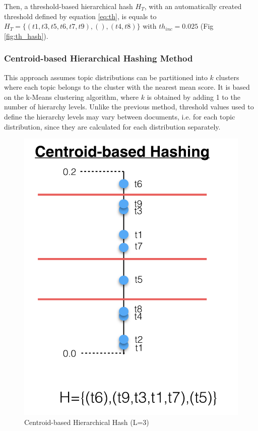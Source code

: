 Then, a threshold-based hierarchical hash $H_{T}$, with an automatically created threshold defined by equation \ref{eq:th}, is equals to $H_{T}=\{(t1,t3,t5,t6,t7,t9),(),(t4,t8)\}$ with $th_{inc}=0.025$ (Fig  \ref{fig:th_hash}).

\subsubsection{Centroid-based Hierarchical Hashing Method}
\label{sec:comparison-centroid}
This approach assumes topic distributions can be partitioned into $k$ clusters where each topic belongs to the cluster with the nearest mean score. It is based on the k-Means clustering algorithm, where $k$ is obtained by adding 1 to the number of hierarchy levels. Unlike the previous method, threshold values used to define the hierarchy levels may vary between documents, i.e. for each topic distribution, since they are calculated for each distribution separately.

\begin{figure}[t]\centering
\includegraphics[scale=0.35]{centroid-hash.png}
\caption{Centroid-based Hierarchical Hash (L=3)}
\label{fig:centroid_hash}
\end{figure}

